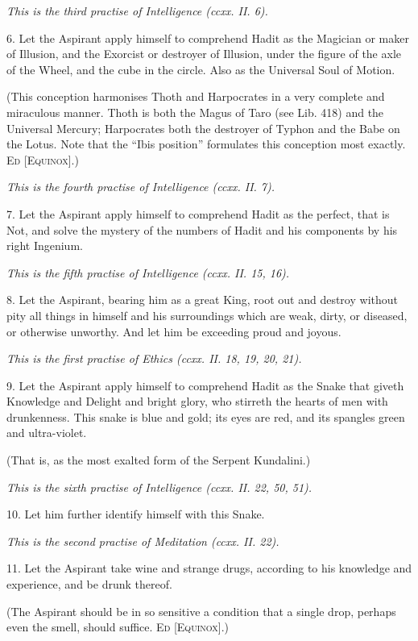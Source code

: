 \textit{This is the third practise of Intelligence (ccxx. II. 6).}

6. Let the Aspirant apply himself to comprehend Hadit as the Magician or maker of Illusion, and the Exorcist or destroyer of Illusion, under the figure of the axle of the Wheel, and the cube in the circle. Also as the Universal Soul of Motion.

(This conception harmonises Thoth and Harpocrates in a very complete and miraculous manner. Thoth is both the Magus of Taro (see Lib. 418) and the Universal Mercury; Harpocrates both the destroyer of Typhon and the Babe on the Lotus. Note that the \enquote{Ibis position} formulates this conception most exactly. \textsc{Ed [Equinox]}.)

\textit{This is the fourth practise of Intelligence (ccxx. II. 7).}

7. Let the Aspirant apply himself to comprehend Hadit as the perfect, that is Not, and solve the mystery of the numbers of Hadit and his components by his right Ingenium.

\textit{This is the fifth practise of Intelligence (ccxx. II. 15, 16).}

8. Let the Aspirant, bearing him as a great King, root out and destroy without pity all things in himself and his surroundings which are weak, dirty, or diseased, or otherwise unworthy. And let him be exceeding proud and joyous.

\textit{This is the first practise of Ethics (ccxx. II. 18, 19, 20, 21).}

9. Let the Aspirant apply himself to comprehend Hadit as the Snake that giveth Knowledge and Delight and bright glory, who stirreth the hearts of men with drunkenness. This snake is blue and gold; its eyes are red, and its spangles green and ultra-violet.

(That is, as the most exalted form of the Serpent Kundalini.)

\textit{This is the sixth practise of Intelligence (ccxx. II. 22, 50, 51).}

10. Let him further identify himself with this Snake.

\textit{This is the second practise of Meditation (ccxx. II. 22).}

11. Let the Aspirant take wine and strange drugs, according to his knowledge and experience, and be drunk thereof.

(The Aspirant should be in so sensitive a condition that a single drop, perhaps even the smell, should suffice. \textsc{Ed [Equinox]}.)

